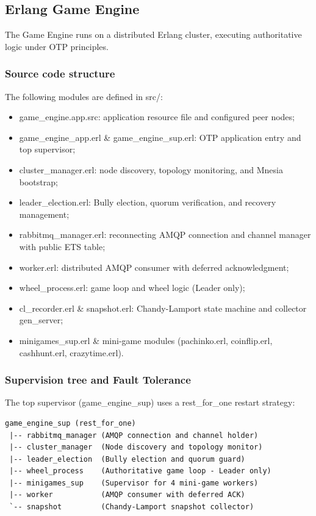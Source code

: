 \documentclass[12pt,a4paper]{article}
\begin{document}
\clearpage
\subsection{Erlang Game Engine}
The Game Engine runs on a distributed Erlang cluster, executing authoritative logic under OTP principles.

\subsubsection{Source code structure}
The following modules are defined in src/:
\begin{itemize}
    \item game\_\allowbreak engine.app.src: application resource file and configured peer nodes;
    \item game\_\allowbreak engine\_\allowbreak app.erl \& game\_\allowbreak engine\_\allowbreak sup.erl: OTP application entry and top supervisor;
    \item cluster\_\allowbreak manager.erl: node discovery, topology monitoring, and Mnesia bootstrap;
    \item leader\_\allowbreak election.erl: Bully election, quorum verification, and recovery management;
    \item rabbitmq\_\allowbreak manager.erl: reconnecting AMQP connection and channel manager with public ETS table;
    \item worker.erl: distributed AMQP consumer with deferred acknowledgment;
    \item wheel\_\allowbreak process.erl: game loop and wheel logic (Leader only);
    \item cl\_\allowbreak recorder.erl \& snapshot.erl: Chandy-Lamport state machine and collector gen\_\allowbreak server;
    \item minigames\_\allowbreak sup.erl \& mini-game modules (pachinko.erl, coinflip.erl, cashhunt.erl, crazytime.erl).
\end{itemize}

\subsubsection{Supervision tree and Fault Tolerance}
The top supervisor (game\_\allowbreak engine\_\allowbreak sup) uses a rest\_\allowbreak for\_\allowbreak one restart strategy:
\begin{lstlisting}[basicstyle=\ttfamily, breaklines=true]
game_engine_sup (rest_for_one)
 |-- rabbitmq_manager (AMQP connection and channel holder)
 |-- cluster_manager  (Node discovery and topology monitor)
 |-- leader_election  (Bully election and quorum guard)
 |-- wheel_process    (Authoritative game loop - Leader only)
 |-- minigames_sup    (Supervisor for 4 mini-game workers)
 |-- worker           (AMQP consumer with deferred ACK)
 `-- snapshot         (Chandy-Lamport snapshot collector)
\end{lstlisting}
\end{document}
